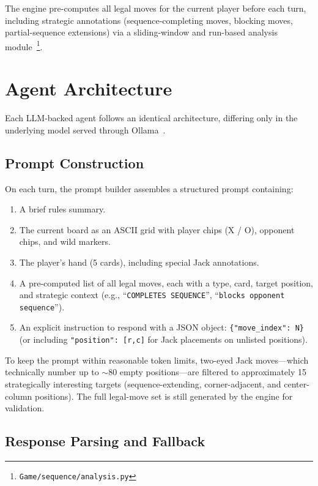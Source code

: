 \documentclass[11pt]{article}
\begin{document}
The engine pre-computes all legal moves for the current player before each turn, including strategic annotations (sequence-completing moves, blocking moves, partial-sequence extensions) via a sliding-window and run-based analysis module~\footnote{\texttt{Game/sequence/analysis.py}}.

\section{Agent Architecture}

Each LLM-backed agent follows an identical architecture, differing only in the underlying model served through Ollama~\cite{ollama}.

\subsection{Prompt Construction}

On each turn, the prompt builder assembles a structured prompt containing:
\begin{enumerate}[nosep,label=(\roman*)]
\item A brief rules summary.
\item The current board as an ASCII grid with player chips (X / O), opponent chips, and wild markers.
\item The player's hand (5 cards), including special Jack annotations.
\item A pre-computed list of all legal moves, each with a type, card, target position, and strategic context (e.g., ``\texttt{COMPLETES SEQUENCE}'', ``\texttt{blocks opponent sequence}'').
\item An explicit instruction to respond with a JSON object: \texttt{\{"move\_index": N\}} (or including \texttt{"position": [r,c]} for Jack placements on unlisted positions).
\end{enumerate}

To keep the prompt within reasonable token limits, two-eyed Jack moves---which technically number up to $\sim$80 empty positions---are filtered to approximately 15 strategically interesting targets (sequence-extending, corner-adjacent, and center-column positions). The full legal-move set is still generated by the engine for validation.

\subsection{Response Parsing and Fallback}
\end{document}
